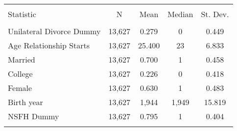 
\begin{tabular}{@{\extracolsep{5pt}}lcccc} 
\\[-1.8ex]\hline 
\hline \\[-1.8ex] 
Statistic & \multicolumn{1}{c}{N} & \multicolumn{1}{c}{Mean} & \multicolumn{1}{c}{Median} & \multicolumn{1}{c}{St. Dev.} \\ 
\hline \\[-1.8ex] 
Unilateral Divorce Dummy & 13,627 & 0.279 & 0 & 0.449 \\ 
Age Relationship Starts & 13,627 & 25.400 & 23 & 6.833 \\ 
Married & 13,627 & 0.700 & 1 & 0.458 \\ 
College & 13,627 & 0.226 & 0 & 0.418 \\ 
Female & 13,627 & 0.630 & 1 & 0.483 \\ 
Birth year & 13,627 & 1,944 & 1,949 & 15.819 \\ 
NSFH  Dummy& 13,627 & 0.795 & 1 & 0.404 \\ 
\hline \\[-1.8ex] 
\end{tabular} 
